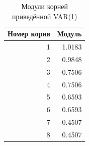 \begin{table}[H]
\centering
\small

\begin{tabular}{r|r}
\hline
Номер корня & Модуль\\
\hline
1 & 1.0183\\
\hline
2 & 0.9848\\
\hline
3 & 0.7506\\
\hline
4 & 0.7506\\
\hline
5 & 0.6593\\
\hline
6 & 0.6593\\
\hline
7 & 0.4507\\
\hline
8 & 0.4507\\
\hline
\end{tabular}
\caption{Модули корней приведённой VAR(1)}
\label{tab:var_roots_const}
\end{table}
